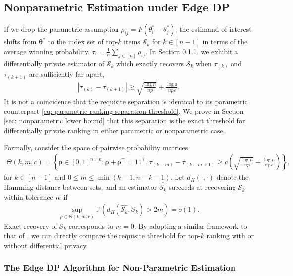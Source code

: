\documentclass[letterpaper,12pt]{article}
\numberwithin{equation}{section}
\theoremstyle{plain}
\numberwithin{Theorem}{section}
\numberwithin{corollary}{section}
\numberwithin{proposition}{section}
\numberwithin{Lemma}{section}
{
	\theoremstyle{definition}
	\newtheorem{Definition}{Definition}
	\newtheorem{example}{Example}
	\numberwithin{example}{section}
	\newtheorem{fact}{Fact}
	\numberwithin{fact}{section}
	\newtheorem{remark}{Remark}
}
\newcommand{\Pro}{\mathbb{P}}
\newcommand{\1}{\mathbbm{1}}
\def\bth{{\boldsymbol{\theta}}}
\begin{document}
\subsection{Nonparametric Estimation under Edge DP}\label{sec: edge dp nonparametric ranking}

If we drop the parametric assumption $\rho_{ij} = F(\theta^*_i - \theta^*_j)$, the estimand of interest shifts from $\bth^*$ to the index set of top-$k$ items $\mathcal S_k$ for $k \in [n-1]$ in terms of the average winning probability, $\tau_i = \frac{1}{n}\sum_{j \in [n]} \rho_{ij}$. In Section \ref{sec: nonparametric ranking upper bound}, we exhibit a differentially private estimator of $\mathcal S_k$ which exactly recovers $\mathcal S_k$ when $\tau_{(k)}$ and $\tau_{(k+1)}$ are sufficiently far apart,
\begin{align*}
	|\tau_{(k)} - \tau_{(k+1)}| \gtrsim \sqrt{\frac{\log n}{np}} + \frac{\log n}{np\varepsilon}. 
\end{align*}
It is not a coincidence that the requisite separation is identical to its parametric counterpart \eqref{eq: parametric ranking separation threshold}. We prove in Section \ref{sec: nonparametric lower bound} that this separation is the exact threshold for differentially private ranking in either parametric or nonparametric case.

Formally, consider the space of pairwise probability matrices
\begin{align*}
	\Theta(k,m,c) = \left\{\bm \rho \in [0,1]^{n \times n}: \bm \rho + \bm \rho^\top = 11^\top, \tau_{(k-m)} - \tau_{(k+m+1)} \geq c\left(\sqrt{\frac{\log n}{np}} + \frac{\log n}{np\varepsilon}\right)\right\},
\end{align*}
for $k \in [n-1]$ and $0 \leq m \leq \min(k-1, n-k-1)$. Let $d_H(\cdot, \cdot)$ denote the Hamming distance between sets, and an estimator $\widehat{\mathcal S_k}$ succeeds at recovering $\mathcal S_k$ within tolerance $m$ if
\begin{align*}
	\sup_{\rho \in \Theta(k, m, c)} \Pro\left(d_H(\widehat{\mathcal S_k}, \mathcal S_k) > 2m \right) =  o(1).
\end{align*}
Exact recovery of $\mathcal S_k$ corresponds to $m = 0$. By adopting a similar framework to that of \cite{shah2017simple}, we can directly compare the requisite threshold for top-$k$ ranking with or without differential privacy.

\subsubsection{The Edge DP Algorithm for Non-Parametric Estimation}
\label{sec: nonparametric ranking upper bound}
\end{document}
